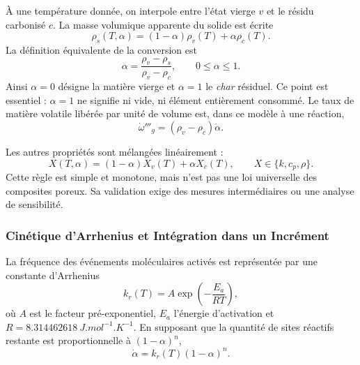 \documentclass[oneside,openany]{amsdtx}
\begin{document}
À une température donnée, on interpole entre l'état vierge \(v\) et le résidu
carbonisé \(c\). La masse volumique apparente du solide est écrite
\begin{equation}
  \rho_s(T,\alpha)=(1-\alpha)\rho_v(T)+\alpha\rho_c(T).
  \label{eq:density-mix}
\end{equation}
La définition équivalente de la conversion est
\begin{equation}
  \alpha=\frac{\rho_v-\rho_s}{\rho_v-\rho_c},\qquad 0\le\alpha\le1.
  \label{eq:alpha-density}
\end{equation}
Ainsi \(\alpha=0\) désigne la matière vierge et \(\alpha=1\) le
\emph{char} résiduel. Ce point est essentiel : \(\alpha=1\) ne signifie ni vide,
ni élément entièrement consommé. Le taux de matière volatile libérée par unité
de volume est, dans ce modèle à une réaction,
\begin{equation}
  \dot\omega'''_g=(\rho_v-\rho_c)\dot\alpha.
  \label{eq:gas-source}
\end{equation}

Les autres propriétés sont mélangées linéairement :
\begin{equation}
  X(T,\alpha)=(1-\alpha)X_v(T)+\alpha X_c(T),
  \qquad X\in\{k,c_p,\rho\}.
  \label{eq:mix-rule}
\end{equation}
Cette règle est simple et monotone, mais n'est pas une loi universelle des
composites poreux. Sa validation exige des mesures intermédiaires ou une analyse
de sensibilité.

\subsubsection{Cinétique d'Arrhenius et Intégration dans un Incrément}

La fréquence des événements moléculaires activés est représentée par une
constante d'Arrhenius
\begin{equation}
  k_r(T)=A\exp\left(-\frac{E_a}{R T}\right),
  \label{eq:arrhenius}
\end{equation}
où \(A\) est le facteur pré-exponentiel, \(E_a\) l'énergie d'activation et
\(R=\SI{8.314462618}{J.mol^{-1}.K^{-1}}\). En supposant que la quantité de sites
réactifs restante est proportionnelle à \((1-\alpha)^n\),
\begin{equation}
  \boxed{\dot\alpha=k_r(T)(1-\alpha)^n.}
  \label{eq:kinetic-law}
\end{equation}
\end{document}
